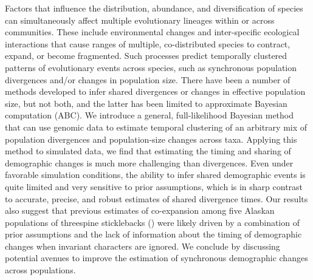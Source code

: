 Factors that influence the distribution, abundance, and
diversification of species can simultaneously affect multiple evolutionary
lineages within or across communities.
These include environmental changes and inter-specific ecological interactions
that cause ranges of multiple, co-distributed species to contract,
expand, or become fragmented.
Such processes predict temporally clustered patterns of evolutionary events
across species, such as synchronous population divergences and/or changes in
population size.
There have been a number of methods developed to infer shared divergences or
changes in effective population size, but not both, and the latter has been
limited to approximate Bayesian computation (ABC).
We introduce a general, full-likelihood Bayesian method that can use genomic
data to estimate temporal clustering of an arbitrary mix of population
divergences and population-size changes across taxa.
Applying this method to simulated data,
we find that estimating the timing and sharing of demographic changes is much
more challenging than divergences.
Even under favorable simulation conditions, the ability to infer shared
demographic events is quite limited and very sensitive to prior assumptions,
which is in sharp contrast to accurate, precise, and robust estimates of shared
divergence times.
Our results also suggest that previous estimates of co-expansion among five
Alaskan populations of threespine sticklebacks ()
were likely
driven by a combination of
prior assumptions and the lack of information about the timing of demographic
changes when invariant characters are ignored.
We conclude by discussing potential avenues to improve the estimation of
synchronous demographic changes across populations.
